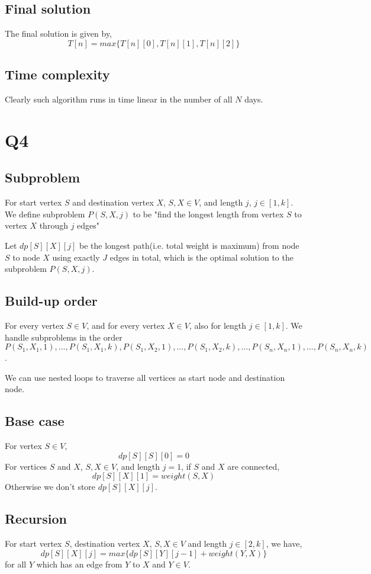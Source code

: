 \documentclass[a4paper]{article}
\begin{document}
	\subsection*{Final solution}
	The final solution is given by,
	\[T[n] = max\{T[n][0], T[n][1], T[n][2]\}\]
	\subsection*{Time complexity}
	Clearly such algorithm runs in time linear in the number of all $N$ days.
	
	\section*{Q4}
	\subsection*{Subproblem}
	For start vertex $S$ and destination vertex $X$, $S, X \in V$, and length $j$, $j \in [1, k]$. We define subproblem $P(S, X, j)$ to be "find the longest length from vertex $S$ to vertex $X$ through $j$ edges" 
	
	Let $dp[S][X][j]$ be the longest path(i.e. total weight is maximum) from node $S$ to node $X$ using exactly $J$ edges in total, which is the optimal solution to the subproblem $P(S, X, j)$.
	\subsection*{Build-up order}
	For every vertex $S \in V$, and for every vertex $X \in V$, also for length $j \in [1,k]$. We handle subproblems in the order $P(S_1, X_1, 1),\dots ,P(S_1, X_1, k), P(S_1, X_2, 1),\dots ,P(S_1, X_2, k),\dots,P(S_n, X_n, 1),\dots ,P(S_n, X_n, k)$.
	
	We can use nested loops to traverse all vertices as start node and destination node.
	\subsection*{Base case}
	For vertex $S \in V$,
	\[dp[S][S][0] = 0\]
	For vertices $S$ and $X$, $S, X \in V$, and length $j = 1$, if $S$ and $X$ are connected,
	\[dp[S][X][1] = weight(S,X)\]
	Otherwise we don't store $dp[S][X][j]$.
	\subsection*{Recursion}
	For start vertex $S$, destination vertex $X$, $S, X\in V$ and length $j \in [2, k]$, we have,
	\[dp[S][X][j] = max\{dp[S][Y][j-1] + weight(Y,X)\}\]
	for all $Y$ which has an edge from $Y$ to $X$ and $Y \in V$.
\end{document}
